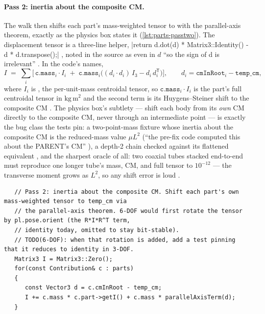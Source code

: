 \paragraph{Pass 2: inertia about the composite CM.} The walk then shifts each part's
mass-weighted tensor to  with the parallel-axis theorem, exactly as the physics
box states it (\cref{lst:parts-passtwo}). The displacement tensor is a three-line helper,
\cppinline|return d.dot(d) * Matrix3::Identity() - d * d.transpose();|
, noted in the source as even in $d$ ``so the sign of d is
irrelevant'' . In the code's names,
\begin{equation}
I \;=\; \sum_i \Big[\, \mathtt{c.mass}_i \cdot I_i \;+\;
   \mathtt{c.mass}_i \big( (d_i \cdot d_i)\, I_3 - d_i\, d_i^{\mathsf{T}} \big) \Big],
\qquad d_i = \mathtt{cmInRoot}_i - \mathtt{temp\_cm},
\label{eq:parts-passtwo}
\end{equation}
where $I_i$ is , the per-unit-mass centroidal tensor, so
$\mathtt{c.mass}_i \cdot I_i$ is the part's full centroidal tensor in $\mathrm{kg\,m}^2$ and
the second term is its Huygens--Steiner shift to the composite CM
. The physics box's subtlety --- shift each body from its
\emph{own} CM directly to the composite CM, never through an intermediate point --- is exactly
the bug class the tests pin: a two-point-mass fixture whose inertia about the composite CM is
the reduced-mass value $\mu L^2$ (``the pre-fix code computed this about the PARENT's CM''
), a depth-2 chain checked against its flattened
equivalent , and the sharpest oracle of all: two coaxial
tubes stacked end-to-end must reproduce one longer tube's mass, CM, and full tensor to
$10^{-12}$ --- the transverse moment grows as $L^2$, so any shift error is loud
.

\begin{listing}[htbp]
\begin{verbatim}
   // Pass 2: inertia about the composite CM. Shift each part's own mass-weighted tensor to temp_cm via
   // the parallel-axis theorem. 6-DOF would first rotate the tensor by pl.pose.orient (the R*I*R^T term,
   // identity today, omitted to stay bit-stable).
   // TODO(6-DOF): when that rotation is added, add a test pinning that it reduces to identity in 3-DOF.
   Matrix3 I = Matrix3::Zero();
   for(const Contribution& c : parts)
   {
      const Vector3 d = c.cmInRoot - temp_cm;
      I += c.mass * c.part->getI() + c.mass * parallelAxisTerm(d);
   }
\end{verbatim}
\caption{Pass 2 of the composite walk : the parallel-axis
accumulation of \cref{eq:parts-passtwo}, with the in-tree comment naming the one deliberately
omitted term --- the child-tensor rotation that six-degree-of-freedom flight will
require.}\label{lst:parts-passtwo}
\end{listing}


